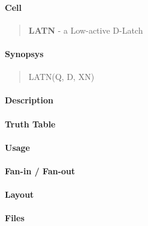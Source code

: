 \label{LATN}
\paragraph{Cell}
\begin{quote}
    \textbf{LATN} - a Low-active D-Latch
\end{quote}

\paragraph{Synopsys}
\begin{quote}
    LATN(Q, D, XN)
\end{quote}

\paragraph{Description}

%

\paragraph{Truth Table}
%

\paragraph{Usage}

\paragraph{Fan-in / Fan-out}

\paragraph{Layout}

\paragraph{Files}
